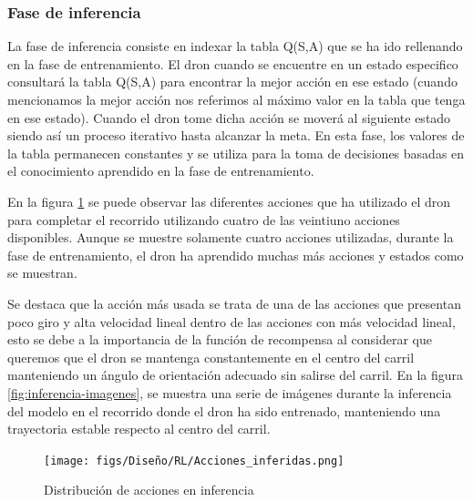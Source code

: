 \subsubsection{Fase de inferencia}
\label{sec:fases_inferencia}
La fase de inferencia consiste en indexar la tabla Q(S,A) que se ha ido rellenando en la fase de entrenamiento. El dron cuando se encuentre en un estado especifico consultará la tabla Q(S,A) para
encontrar la mejor acción en ese estado (cuando mencionamos la mejor acción nos referimos al máximo valor en la tabla que tenga en ese estado). Cuando el dron tome dicha acción se moverá al siguiente estado
siendo así un proceso iterativo hasta alcanzar la meta. En esta fase, los valores de la tabla permanecen constantes y se utiliza para la toma de decisiones basadas en el conocimiento
aprendido en la fase de entrenamiento.

En la figura \ref{fig:Distribucción_inferencia} se puede observar las diferentes acciones que ha utilizado el dron para completar el recorrido utilizando cuatro de las veintiuno acciones
disponibles. Aunque se muestre solamente cuatro acciones utilizadas, durante la fase de entrenamiento, el dron ha aprendido muchas más acciones y estados como se muestran. 

Se destaca que la acción más usada se trata de una de las acciones que presentan poco giro y alta velocidad lineal dentro de las acciones con más velocidad lineal, esto se debe
a la importancia de la función de recompensa al considerar que queremos que el dron se mantenga constantemente en el centro del carril manteniendo un ángulo de orientación adecuado
sin salirse del carril. En la figura \ref{fig:inferencia-imagenes}, se muestra una serie de imágenes durante la inferencia del modelo en el recorrido donde el dron ha sido entrenado, manteniendo una trayectoria 
estable respecto al centro del carril.

\begin{figure} [H]
  \begin{center}
    \texttt{[image: figs/Diseño/RL/Acciones\_inferidas.png]}
  \end{center}
  \caption{Distribución de acciones en inferencia}
  \label{fig:Distribucción_inferencia}
\end{figure}

